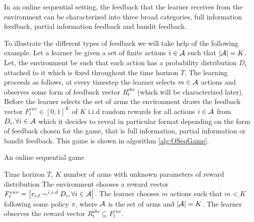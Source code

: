 In an online sequential setting, the feedback that the learner receives from the environment can be characterized into three broad categories, full information feedback, partial information feedback and bandit feedback. 


    To illustrate the different types of feedback we will take help of the following example. Let a learner be given a set of finite actions $i\in\mathcal{A}$ such that $|\mathcal{A}|=K$. Let, the environment be such that each action has a probability distribution $D_i$ attached to it which is fixed throughout the time horizon $T$. The learning proceeds as follows, at every timestep the learner selects $m\in\mathcal{A}$ actions and observes some form of feedback vector $R^{obs}_{t}$ (which will be characterized later). Before the learner selects the set of arms the environment draws the feedback vector $F^{env}_t\in[0,1]^{K}$ of $K$ i.i.d random rewards for all actions $i\in\mathcal{A}$ from $D_i,\forall i\in\mathcal{A}$ which it decides to reveal in particular format depending on the form of feedback chosen for the game, that is full information, partial information or bandit feedback. This game is shown in algorithm \ref{alg:OSeqGame}. 

\begin{algorithm}[!th]
\caption{An online sequential game}
\label{alg:OSeqGame}
\begin{algorithmic}
 Time horizon $T$, $K$ number of arms with unknown parameters of reward distribution
\State {}
\State The environment chooses a reward vector $F^{env}_{t}= \left[r_{i,t}\sim^{i.i.d} D_{i},\forall i\in\mathcal{A}\right]$.
\State The learner chooses $m$ actions such that $m < K$ following some policy $\pi$, where $\mathcal{A}$ is the set of arms and $|\mathcal{A}|=K$.
\State The learner observes the reward vector $R^{obs}_{t}\subseteq F^{env}_{t}$.
\State \EndFor
\end{algorithmic}
\end{algorithm}



